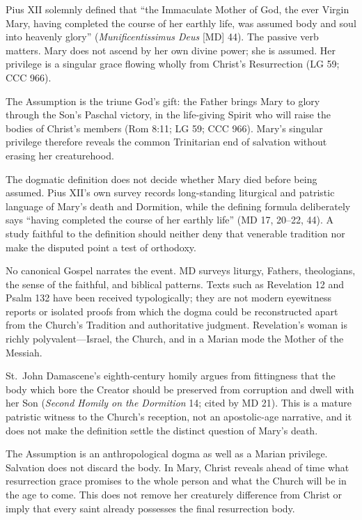 Pius XII solemnly defined that ``the Immaculate Mother of God, the ever Virgin Mary, having completed the course of her earthly life, was assumed body and soul into heavenly glory'' (\emph{Munificentissimus Deus} [MD] 44). The passive verb matters. Mary does not ascend by her own divine power; she is assumed. Her privilege is a singular grace flowing wholly from Christ's Resurrection (LG 59; CCC 966).

The Assumption is the triune God's gift: the Father brings Mary to glory through the Son's Paschal victory, in the life-giving Spirit who will raise the bodies of Christ's members (Rom 8:11; LG 59; CCC 966). Mary's singular privilege therefore reveals the common Trinitarian end of salvation without erasing her creaturehood.

The dogmatic definition does not decide whether Mary died before being assumed. Pius XII's own survey records long-standing liturgical and patristic language of Mary's death and Dormition, while the defining formula deliberately says ``having completed the course of her earthly life'' (MD 17, 20--22, 44). A study faithful to the definition should neither deny that venerable tradition nor make the disputed point a test of orthodoxy.

No canonical Gospel narrates the event. MD surveys liturgy, Fathers, theologians, the sense of the faithful, and biblical patterns. Texts such as Revelation 12 and Psalm 132 have been received typologically; they are not modern eyewitness reports or isolated proofs from which the dogma could be reconstructed apart from the Church's Tradition and authoritative judgment. Revelation's woman is richly polyvalent---Israel, the Church, and in a Marian mode the Mother of the Messiah.

St.~John Damascene's eighth-century homily argues from fittingness that the body which bore the Creator should be preserved from corruption and dwell with her Son (\emph{Second Homily on the Dormition} 14; cited by MD 21). This is a mature patristic witness to the Church's reception, not an apostolic-age narrative, and it does not make the definition settle the distinct question of Mary's death.

The Assumption is an anthropological dogma as well as a Marian privilege. Salvation does not discard the body. In Mary, Christ reveals ahead of time what resurrection grace promises to the whole person and what the Church will be in the age to come. This does not remove her creaturely difference from Christ or imply that every saint already possesses the final resurrection body.

